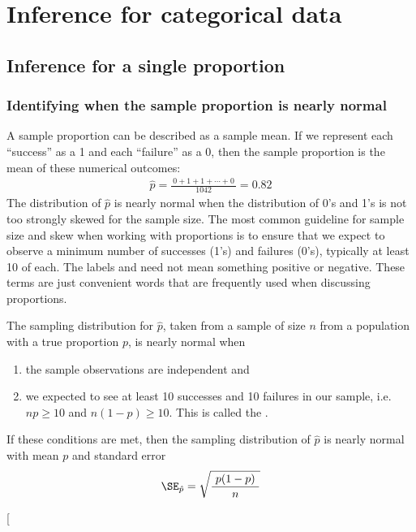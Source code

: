 
\chapter{Inference for categorical data}
\label{inferenceForCategoricalData}


\section{Inference for a single proportion}
\label{singleProportion}


\subsection{Identifying when the sample proportion is nearly normal}\label{tenpercent}

A sample proportion can be described as a sample mean. If we represent each ``success'' as a 1 and each ``failure'' as a 0, then the sample proportion is the mean of these numerical outcomes:
\begin{eqnarray*}
\hat{p} = \frac{\ 0 + 1 + 1 + \cdots + 0\ }{1042} = 0.82
\end{eqnarray*}
The distribution of $\hat{p}$ is nearly normal when the distribution of 0's and 1's is not too strongly skewed for the sample size. The most common guideline for sample size and skew when working with proportions is to ensure that we expect to observe a minimum number of successes (1's) and failures (0's), typically at least 10 of each. The labels  and  need not mean something positive or negative. These terms are just convenient words that are frequently used when discussing proportions.

\begin{termBox}{
The sampling distribution for $\hat{p}$, taken from a sample of size $n$ from a population with a true proportion $p$, is nearly normal when
\begin{enumerate}
\item the sample observations are independent and
\item we expected to see at least 10 successes and 10 failures in our sample, i.e. $np\geq10$ and $n(1-p)\geq10$. This is called the .
\end{enumerate}
If these conditions are met, then the sampling distribution of $\hat{p}$ is nearly normal with mean $p$ and standard error
\begin{eqnarray}
\SE_{\hat{p}} = \sqrt{\frac{\ p(1-p)\ }{n}}
\label{seOfPHat}
\end{eqnarray}}
\end{termBox}\marginpar[\raggedright\vspace{-53mm}

